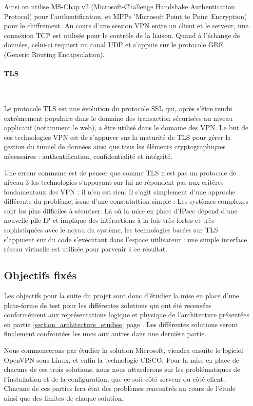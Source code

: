 Ainsi on utilise MS-Chap v2 (Microsoft-Challenge Handshake Authentication Protocol) pour l'authentification, et MPPe 'Microsoft Point to Point Encryption) pour le chiffrement. Au cours d'une session VPN entre un client et le serveur, une connexion TCP est utilisée pour le contrôle de la liaison. Quand à l'échange de données, celui-ci requiert un canal UDP et s'appuie sur le protocole GRE (Generic Routing Encapsulation).


\paragraph{TLS}
~

Le protocole TLS est une évolution du protocole SSL qui, après s'être rendu extrêmement populaire dans le domaine des transaction sécurisées au niveau applicatif (notamment le web), a être utilisé dans le domaine des VPN. Le but de ces technologies VPN est de s'appuyer sur la maturité de TLS pour gérer la gestion du tunnel de données ainsi que tous les éléments cryptographiques nécessaires : authentification, confidentialité et intégrité.

Une erreur commune est de penser que comme TLS n'est pas un protocole de niveau 3 les technologies s'appuyant sur lui ne répondent pas aux critères fondamentaux des VPN : il n'en est rien. Il s'agit simplement d'une approche différente du problème, issue d'une constatattion simple : Les systèmes complexes sont les plus difficiles à sécuriser. Là où la mise en place d'IPsec dépend d'une nouvelle pile IP et implique des intéractions à la fois très fortes et très sophistiquées avec le noyau du système, les technologies basées sur TLS s'appuient sur du code s'exécutant dans l'espace utilisateur : une simple interface réseau virtuelle est utilisée pour parvenir à ce résultat.


\subsection{Objectifs fixés}

Les objectifs pour la suite du projet sont donc d'étudier la mise en place d'une plate-forme de test pour les différentes solutions qui ont été recensées conformément aux représentations logique et physique de l'architecture présentées en partie \ref{section_architecture_etudiee} page \pageref{section_architecture_etudiee}. Les différentes solutions seront finalement confrontées les unes aux autres dans une dernière partie.

Nous commencerons par étudier la solution Microsoft, viendra ensuite le logiciel OpenVPN sous Linux, et enfin la technologie CISCO. Pour la mise en place de chacune de ces trois solutions, nous nous attarderons sur les problématiques de l'installation et de la configuration, que ce soit côté serveur ou côté client. Chacune de ces parties fera état des problèmes rencontrés au cours de l'étude ainsi que des limites de chaque solution.

